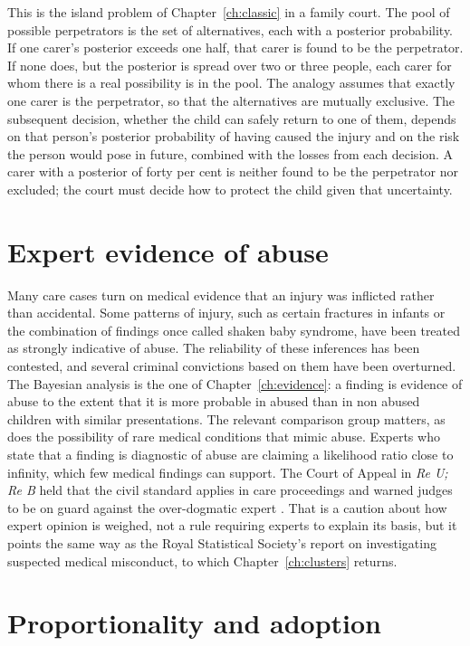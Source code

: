 This is the island problem of Chapter~\ref{ch:classic} in a family court. The pool of possible perpetrators is the set of alternatives, each with a posterior probability. If one carer's posterior exceeds one half, that carer is found to be the perpetrator. If none does, but the posterior is spread over two or three people, each carer for whom there is a real possibility is in the pool. The analogy assumes that exactly one carer is the perpetrator, so that the alternatives are mutually exclusive. The subsequent decision, whether the child can safely return to one of them, depends on that person's posterior probability of having caused the injury and on the risk the person would pose in future, combined with the losses from each decision. A carer with a posterior of forty per cent is neither found to be the perpetrator nor excluded; the court must decide how to protect the child given that uncertainty.

\section{Expert evidence of abuse}

Many care cases turn on medical evidence that an injury was inflicted rather than accidental. Some patterns of injury, such as certain fractures in infants or the combination of findings once called shaken baby syndrome, have been treated as strongly indicative of abuse. The reliability of these inferences has been contested, and several criminal convictions based on them have been overturned. The Bayesian analysis is the one of Chapter~\ref{ch:evidence}: a finding is evidence of abuse to the extent that it is more probable in abused than in non abused children with similar presentations. The relevant comparison group matters, as does the possibility of rare medical conditions that mimic abuse. Experts who state that a finding is diagnostic of abuse are claiming a likelihood ratio close to infinity, which few medical findings can support. The Court of Appeal in \emph{Re U; Re B} held that the civil standard applies in care proceedings and warned judges to be on guard against the over-dogmatic expert \citep{reu2004}. That is a caution about how expert opinion is weighed, not a rule requiring experts to explain its basis, but it points the same way as the Royal Statistical Society's report on investigating suspected medical misconduct, to which Chapter~\ref{ch:clusters} returns.

\section{Proportionality and adoption}


